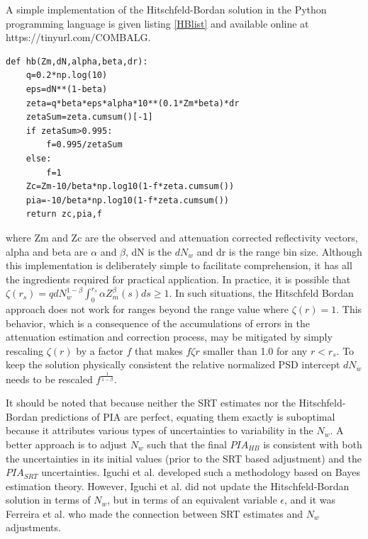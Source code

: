 \documentclass[10pt]{ietbook}
\begin{document}
A simple implementation of the Hitschfeld-Bordan solution in the Python programming language is given listing \ref{HBlist} and
available online at \\https://tinyurl.com/COMBALG.
\begin{lstlisting}[caption={Python implementation of the Histchfeld-Bordan solution.},captionpos=b,label={HBlist}]
def hb(Zm,dN,alpha,beta,dr):
    q=0.2*np.log(10)
    eps=dN**(1-beta)
    zeta=q*beta*eps*alpha*10**(0.1*Zm*beta)*dr
    zetaSum=zeta.cumsum()[-1]
    if zetaSum>0.995:
        f=0.995/zetaSum
    else:
        f=1
    Zc=Zm-10/beta*np.log10(1-f*zeta.cumsum())
    pia=-10/beta*np.log10(1-f*zeta.cumsum())
    return zc,pia,f
\end{lstlisting}
where Zm and Zc are the observed and attenuation corrected reflectivity vectors, alpha and beta are $\alpha$ and $\beta$, dN is
the $dN_w$ and dr is the range bin size.  Although this implementation is deliberately simple to facilitate comprehension, 
it has all the ingredients
required for practical application.  In practice, it is possible that $\zeta (r_s) =q dN_w^{1-\beta} \int_0^{r_s}\alpha Z_m^\beta(s)ds \geq 1$. In 
such situations, the Hitschfeld Bordan approach does not work for ranges beyond the range value where $\zeta (r)=1$.  This behavior, which is 
a consequence of the  accumulations of errors in the attenuation estimation and correction process, may be mitigated by simply rescaling 
$\zeta (r)$ by a factor $f$ that makes $f \zeta{r}$ smaller than 1.0 for any $r<r_s$.  To keep the solution physically consistent the 
relative normalized PSD intercept $dN_w$ needs to be rescaled $f^{\frac 1 {1-\beta}}$. 

It should be noted that because neither the SRT estimates nor the Hitschfeld-Bordan predictions of PIA are perfect,
equating them exactly is suboptimal because it attributes various types of uncertainties to variability in the $N_w$.
A better approach is to adjust $N_w$ such that the final $PIA_{HB}$ is consistent with both the uncertainties in its
initial values (prior to the SRT based adjustment) and the $PIA_{SRT}$ uncertainties. Iguchi et al. \cite{iguchi2000}
developed such a methodology based on Bayes estimation theory. However, Iguchi et al. \cite{iguchi2000} did not update
the Hitschfeld-Bordan solution in terms of $N_w$, but in terms of an equivalent variable $\epsilon$, and it was Ferreira
et al. \cite{ferreira2001} who made the connection between SRT estimates and $N_w$ adjustments.
\end{document}
